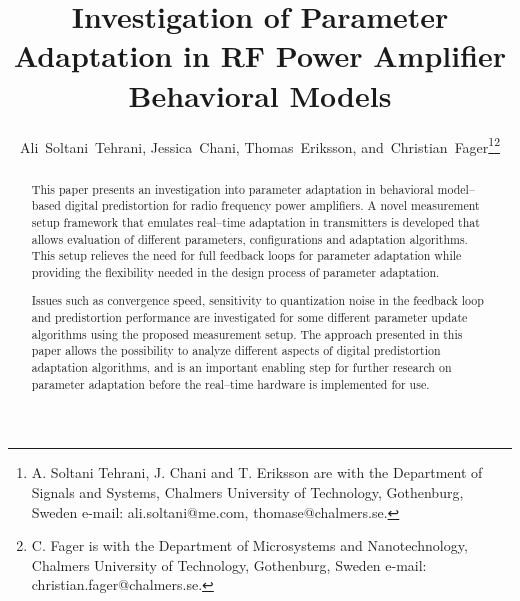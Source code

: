 \documentclass[journal]{IEEEtran}
\begin{document}
\title{Investigation of Parameter Adaptation in RF Power Amplifier Behavioral Models}

\author{Ali~Soltani~Tehrani,
        Jessica~Chani,
        Thomas~Eriksson,
        and~Christian~Fager\thanks{A. Soltani Tehrani, J. Chani and T. Eriksson are with the Department
of Signals and Systems, Chalmers University of Technology, Gothenburg,
Sweden e-mail: ali.soltani@me.com, thomase@chalmers.se.}\thanks{C. Fager is with the Department of Microsystems and Nanotechnology, Chalmers University of Technology, Gothenburg,
Sweden e-mail: christian.fager@chalmers.se.}}



\maketitle


\begin{abstract}
This paper presents an investigation into parameter adaptation in behavioral model--based digital predistortion for radio frequency power amplifiers. A novel measurement setup framework that emulates real--time adaptation in transmitters is developed that allows evaluation of different parameters, configurations and adaptation algorithms. This setup relieves the need for full feedback loops for parameter adaptation while providing the flexibility needed in the design process of parameter adaptation.

Issues such as convergence speed, sensitivity to quantization noise in the feedback loop and predistortion performance are investigated for some different parameter update algorithms using the proposed measurement setup. The approach presented in this paper allows the possibility to analyze different aspects of digital predistortion adaptation algorithms, and is an important enabling step for further research on parameter adaptation before the real--time hardware is implemented for use.
\end{abstract}





\IEEEpeerreviewmaketitle
\end{document}
